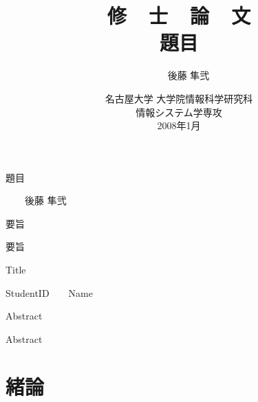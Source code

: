 \documentclass[a4paper,12pt]{jreport}
\title{
{\LARGE\sffamily\gtfamily
修\ \ 士\ \ 論\ \ 文\\
}
\vspace*{.6in}
{\huge\sffamily\gtfamily
題目\\
}
\vfill\vfill\vfill
}
\author{
\LARGE\sffamily\gtfamily
350702101\ \ \ \ 後藤 隼弐\\
}
\date{
\vfill
\Large\sffamily\gtfamily
名古屋大学 大学院情報科学研究科\\[.2in]
情報システム学専攻\\[.2in]
2008年1月
\vfill
}
\begin{document}
\pagestyle{empty}
\vspace*{-1in}
\begin{center}
\Large\sffamily\gtfamily 題目
\end{center}
\begin{flushright}
\large\sffamily{}\ \ \ \ 後藤 隼弐
\end{flushright}
\begin{center}
\large\sffamily\gtfamily 要旨
\end{center}

要旨

\clearpage

\vspace*{-1in}
\begin{center}
\Large\sffamily
Title
\end{center}
\begin{flushright}
\large\sffamily\gtfamily
StudentID\ \ \ \ Name
\end{flushright}
\begin{center}
\large\sffamily Abstract
\end{center}

Abstract

\clearpage

\maketitle
\clearpage

\pagestyle{plain} 
\setcounter{page}{1}
\tableofcontents
\clearpage

\pagestyle{plain} 
\setcounter{page}{1}

\chapter{緒論}
\end{document}
